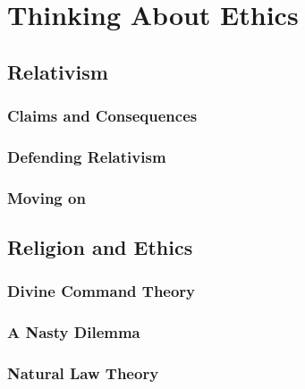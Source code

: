 \documentclass[justified]{tufte-book}
\begin{document}
\hypertarget{part-thinking-about-ethics}{%
\part{Thinking About Ethics}\label{part-thinking-about-ethics}}

\hypertarget{relativism}{%
\chapter{Relativism}\label{relativism}}

\hypertarget{claims-and-consequences}{%
\section{Claims and Consequences}\label{claims-and-consequences}}

\hypertarget{defending-relativism}{%
\section{Defending Relativism}\label{defending-relativism}}

\hypertarget{moving-on}{%
\section{Moving on}\label{moving-on}}

\hypertarget{religion-and-ethics}{%
\chapter{Religion and Ethics}\label{religion-and-ethics}}

\hypertarget{divine-command-theory}{%
\section{Divine Command Theory}\label{divine-command-theory}}

\hypertarget{a-nasty-dilemma}{%
\section{A Nasty Dilemma}\label{a-nasty-dilemma}}

\hypertarget{natural-law-theory}{%
\section{Natural Law Theory}\label{natural-law-theory}}
\end{document}
